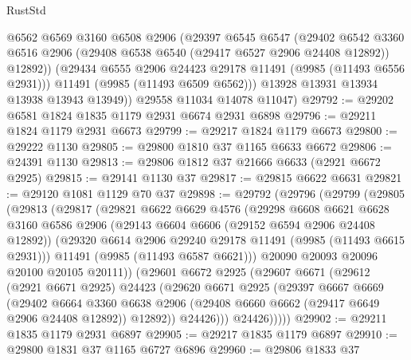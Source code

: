 \begin{lexlean}{RustStd}
\begin{coremodule}
            @6562
            @6569
            @3160
            @6508
            @2906
            (@29397
              @6545
              @6547
              (@29402
                @6542
                @3360
                @6516
                @2906
                (@29408 @6538 @6540 (@29417 @6527 @2906 @24408 @12892))
                @12892))
            (@29434 @6555 @2906 @24423 @29178 @11491 (@9985 (@11493 @6556 @2931)))
            @11491
            (@9985 (@11493 @6509 @6562)))
          @13928
          @13931
          @13934
          @13938
          @13943
          @13949))
      @29558
      @11034
      @14078
      @11047)
@29792 := @29202 @6581 @1824 @1835 @1179 @2931 @6674 @2931 @6898
@29796 := @29211 @1824 @1179 @2931 @6673
@29799 := @29217 @1824 @1179 @6673
@29800 := @29222 @1130
@29805 := @29800 @1810 @37 @1165 @6633 @6672
@29806 := @24391 @1130
@29813 := @29806 @1812 @37 @21666 @6633 (@2921 @6672 @2925)
@29815 := @29141 @1130 @37
@29817 := @29815 @6622 @6631
@29821 := @29120 @1081 @1129 @70 @37
@29898 := @29792
    (@29796
      (@29799
        (@29805
          (@29813
            (@29817
              (@29821
                @6622
                @6629
                @4576
                (@29298
                  @6608
                  @6621
                  @6628
                  @3160
                  @6586
                  @2906
                  (@29143 @6604 @6606 (@29152 @6594 @2906 @24408 @12892))
                  (@29320 @6614 @2906 @29240 @29178 @11491 (@9985 (@11493 @6615 @2931)))
                  @11491
                  (@9985 (@11493 @6587 @6621)))
                @20090
                @20093
                @20096
                @20100
                @20105
                @20111))
            (@29601
              @6672
              @2925
              (@29607
                @6671
                (@29612
                  (@2921 @6671 @2925)
                  @24423
                  (@29620
                    @6671
                    @2925
                    (@29397
                      @6667
                      @6669
                      (@29402
                        @6664
                        @3360
                        @6638
                        @2906
                        (@29408 @6660 @6662 (@29417 @6649 @2906 @24408 @12892))
                        @12892))
                    @24426)))
              @24426)))))
@29902 := @29211 @1835 @1179 @2931 @6897
@29905 := @29217 @1835 @1179 @6897
@29910 := @29800 @1831 @37 @1165 @6727 @6896
@29960 := @29806
    @1833
    @37

\end{coremodule}
\end{lexlean}
